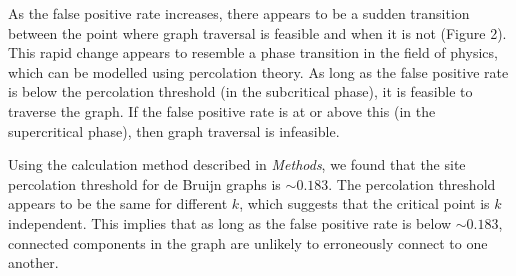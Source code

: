 \documentclass[12pt]{article} \usepackage{simplemargins}
\begin{document}
As the false positive rate increases, there appears to be a sudden
transition between the point where graph traversal is feasible and
when it is not (Figure 2). This rapid change appears to resemble 
a phase transition in the
field of physics, which can be modelled using percolation theory. As
long as the false positive rate is below the percolation threshold (in
the subcritical phase), it is feasible to traverse the graph. If the
false positive rate is at or above this (in the supercritical phase), then graph
traversal is infeasible.

Using the calculation method described in \emph{Methods}, we found that the 
site percolation threshold for de Bruijn graphs is $\sim0.183$. 
The percolation threshold appears to be the same for 
different $k$, which suggests that the 
critical point is $k$ independent. This implies that as long as the 
false positive rate is below $\sim 0.183$, connected components in the graph 
are unlikely to erroneously connect to one another.
\end{document}
